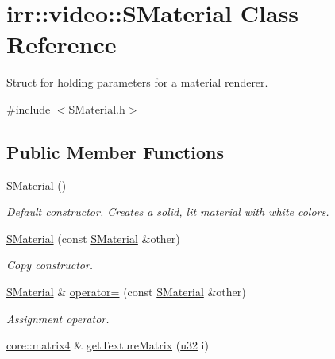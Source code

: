 \hypertarget{classirr_1_1video_1_1SMaterial}{}\section{irr\+:\+:video\+:\+:S\+Material Class Reference}
\label{classirr_1_1video_1_1SMaterial}


Struct for holding parameters for a material renderer.  




{\ttfamily \#include $<$S\+Material.\+h$>$}

\subsection*{Public Member Functions}
\begin{DoxyCompactItemize}
\item 
\mbox{\label{classirr_1_1video_1_1SMaterial_ae5002c3c8ea002539228a9ca95cc8003}} 
\hyperlink{classirr_1_1video_1_1SMaterial_ae5002c3c8ea002539228a9ca95cc8003}{S\+Material} ()
\begin{DoxyCompactList}\small\item\em Default constructor. Creates a solid, lit material with white colors. \end{DoxyCompactList}\item 
\hyperlink{classirr_1_1video_1_1SMaterial_a66f175294b99e3cc2816e9cc0f372ce3}{S\+Material} (const \hyperlink{classirr_1_1video_1_1SMaterial}{S\+Material} \&other)
\begin{DoxyCompactList}\small\item\em Copy constructor. \end{DoxyCompactList}\item 
\hyperlink{classirr_1_1video_1_1SMaterial}{S\+Material} \& \hyperlink{classirr_1_1video_1_1SMaterial_a752ea337daa705d8d7035f0ee93d178d}{operator=} (const \hyperlink{classirr_1_1video_1_1SMaterial}{S\+Material} \&other)
\begin{DoxyCompactList}\small\item\em Assignment operator. \end{DoxyCompactList}\item 
\hyperlink{namespaceirr_1_1core_a73fa92e638c5ca97efd72da307cc9b65}{core\+::matrix4} \& \hyperlink{classirr_1_1video_1_1SMaterial_a102aec38ea69a7c609edfad74b40463c}{get\+Texture\+Matrix} (\hyperlink{namespaceirr_a0416a53257075833e7002efd0a18e804}{u32} i)

\end{DoxyCompactItemize}
